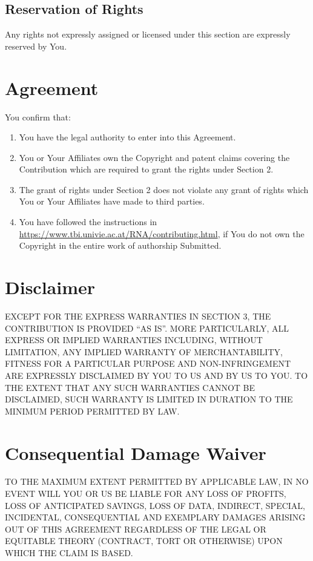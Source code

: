 \documentclass{article}
\begin{document}
\subsection{Reservation of Rights}
Any rights not expressly assigned or licensed under this section are expressly
reserved by You.


\section{Agreement}

You confirm that:
\begin{enumerate}
\item You have the legal authority to enter into this Agreement.
\item You or Your Affiliates own the Copyright and patent claims covering the
Contribution which are required to grant the rights under Section 2.
\item The grant of rights under Section 2 does not violate any grant of rights
which You or Your Affiliates have made to third parties.
\item You have followed the instructions in
\url{https://www.tbi.univie.ac.at/RNA/contributing.html}, if You do not own the
Copyright in the entire work of authorship Submitted.
\end{enumerate}


\section{Disclaimer}

EXCEPT FOR THE EXPRESS WARRANTIES IN SECTION 3, THE CONTRIBUTION IS
PROVIDED ``AS IS''. MORE PARTICULARLY, ALL EXPRESS OR IMPLIED WARRANTIES
INCLUDING, WITHOUT LIMITATION, ANY IMPLIED WARRANTY OF MERCHANTABILITY,
FITNESS FOR A PARTICULAR PURPOSE AND NON-INFRINGEMENT ARE EXPRESSLY
DISCLAIMED BY YOU TO US AND BY US TO YOU. TO THE EXTENT THAT ANY SUCH
WARRANTIES CANNOT BE DISCLAIMED, SUCH WARRANTY IS LIMITED IN DURATION
TO THE MINIMUM PERIOD PERMITTED BY LAW.


\section{Consequential Damage Waiver}

TO THE MAXIMUM EXTENT PERMITTED BY APPLICABLE LAW, IN NO EVENT WILL
YOU OR US BE LIABLE FOR ANY LOSS OF PROFITS, LOSS OF ANTICIPATED SAVINGS,
LOSS OF DATA, INDIRECT, SPECIAL, INCIDENTAL, CONSEQUENTIAL AND EXEMPLARY
DAMAGES ARISING OUT OF THIS AGREEMENT REGARDLESS OF THE LEGAL OR
EQUITABLE THEORY (CONTRACT, TORT OR OTHERWISE) UPON WHICH THE CLAIM IS
BASED.
\end{document}
